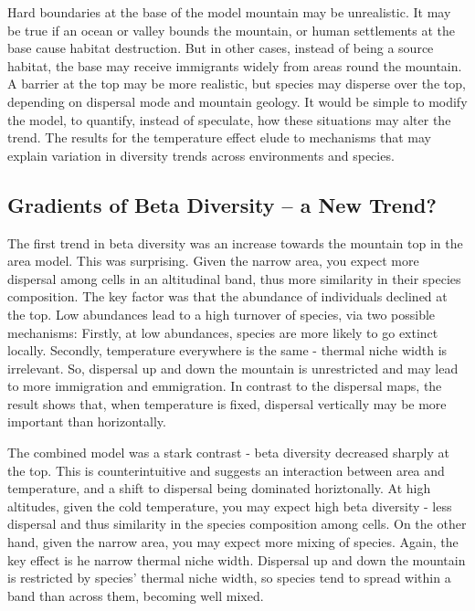 \documentclass[11pt]{article}
\begin{document}
Hard boundaries at the base of the model mountain may be unrealistic. It may be true if an ocean or valley bounds the mountain, or human settlements at the base cause habitat destruction. But in other cases, instead of being a source habitat, the base may receive immigrants widely from areas round the mountain. A barrier at the top may be more realistic, but species may disperse over the top, depending on dispersal mode and mountain geology. It would be simple to modify the model, to quantify, instead of speculate,  how these situations may alter the trend. The results for the temperature effect elude to mechanisms that may explain variation in diversity trends across environments and species.

\subsection*{Gradients of Beta Diversity – a New Trend?}
The first trend in beta diversity was an increase towards the mountain top in the area model.
This was surprising. Given the narrow area, you expect more dispersal among cells in an altitudinal band, thus more similarity in their species composition. The key factor was that the abundance of individuals declined at the top. Low abundances lead to a high turnover of species, via two possible mechanisms: Firstly, at low abundances, species are more likely to go extinct locally. Secondly, temperature everywhere is the same - thermal niche width is irrelevant. So, dispersal up and down the mountain is unrestricted and may lead to more immigration and emmigration. In contrast to the dispersal maps, the result shows that, when temperature is fixed, dispersal vertically may be more important than horizontally.


The combined model was a stark contrast - beta diversity decreased sharply at the top. This is counterintuitive and suggests an interaction between area and temperature, and a shift to dispersal being dominated horiztonally.
At high altitudes, given the cold temperature, you may expect high beta diversity - less dispersal and thus similarity in the species composition among cells. 
On the other hand, given the narrow area, you may expect more mixing of species. Again, the key effect is he narrow thermal niche width. Dispersal up and down the mountain is restricted by species’ thermal niche width, so species tend to spread within a band than across them, becoming well mixed.

%
%
%
\end{document}
